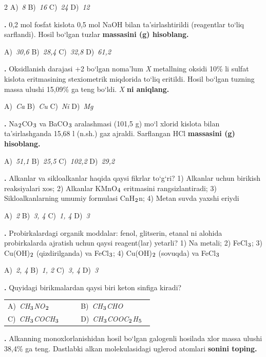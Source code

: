 \documentclass[11pt,a4paper]{article}
\renewcommand{\textsubscript}[1]{\ensuremath{_{\text{\fontsize{8}{8}\selectfont #1}}}}
\newcommand{\qn}[1]{\textbf{\fontsize{11.5}{13}\selectfont #1}}
\newcommand{\qsep}{\par\vspace{13pt}}
\begin{document}
\begin{multicols}{2}
\noindent A)~\textsl{8} \hfill B)~\textsl{16} \hfill C)~\textsl{24} \hfill D)~\textsl{12}\par
\qsep
\noindent\qn{17.} 0,2 mol fosfat kislota 0,5 mol NaOH bilan ta'sirlashtirildi (reagentlar to`liq sarflandi). Hosil bo`lgan tuzlar \textbf{massasini (g) hisoblang.}

\noindent A)~\textsl{30,6} \hfill B)~\textsl{28,4} \hfill C)~\textsl{32,8} \hfill D)~\textsl{61,2}\par
\qsep
\noindent\qn{18.} Oksidlanish darajasi +2 bo`lgan noma'lum \textit{X} metallning oksidi 10\% li sulfat kislota eritmasining stexiometrik miqdorida to`liq eritildi. Hosil bo`lgan tuzning massa ulushi 15,09\% ga teng bo`ldi. \textit{X} \textbf{ni aniqlang.}

\noindent A)~\textsl{Ca} \hfill B)~\textsl{Cu} \hfill C)~\textsl{Ni} \hfill D)~\textsl{Mg}\par
\qsep
\noindent\qn{19.} Na\textsubscript{2}CO\textsubscript{3} va BaCO\textsubscript{3} aralashmasi (101,5 g) mo`l xlorid kislota bilan ta'sirlashganda 15,68 l (n.sh.) gaz ajraldi. Sarflangan HCl \textbf{massasini (g) hisoblang.}

\noindent A)~\textsl{51,1} \hfill B)~\textsl{25,5} \hfill C)~\textsl{102,2} \hfill D)~\textsl{29,2}\par
\qsep
\noindent\qn{20.} Alkanlar va sikloalkanlar haqida qaysi fikrlar to`g`ri? 1) Alkanlar uchun birikish reaksiyalari xos; 2) Alkanlar KMnO\textsubscript{4} eritmasini rangsizlantiradi; 3) Sikloalkanlarning umumiy formulasi CnH\textsubscript{2}n; 4) Metan suvda yaxshi eriydi

\noindent A)~\textsl{2} \hfill B)~\textsl{3, 4} \hfill C)~\textsl{1, 4} \hfill D)~\textsl{3}\par
\qsep
\noindent\qn{21.} Probirkalardagi organik moddalar: fenol, glitserin, etanal ni alohida probirkalarda ajratish uchun qaysi reagent(lar) yetarli? 1) Na metali; 2) FeCl\textsubscript{3}; 3) Cu(OH)\textsubscript{2} (qizdirilganda) va FeCl\textsubscript{3}; 4) Cu(OH)\textsubscript{2} (sovuqda) va FeCl\textsubscript{3}

\noindent A)~\textsl{2, 4} \hfill B)~\textsl{1, 2} \hfill C)~\textsl{3, 4} \hfill D)~\textsl{3}\par
\qsep
\noindent\qn{22.} Quyidagi birikmalardan qaysi biri keton sinfiga kiradi?

\noindent\begin{tabular}{@{}p{0.47\linewidth}@{}p{0.47\linewidth}@{}}
A)~\textsl{CH\textsubscript{3}NO\textsubscript{2}} & B)~\textsl{CH\textsubscript{3}CHO} \\
C)~\textsl{CH\textsubscript{3}COCH\textsubscript{3}} & D)~\textsl{CH\textsubscript{3}COOC\textsubscript{2}H\textsubscript{5}} \\
\end{tabular}\par
\qsep
\noindent\qn{23.} Alkanning monoxlorlanishidan hosil bo`lgan galogenli hosilada xlor massa ulushi 38,4\% ga teng. Dastlabki alkan molekulasidagi uglerod atomlari \textbf{sonini toping.}


\end{multicols}
\end{document}
